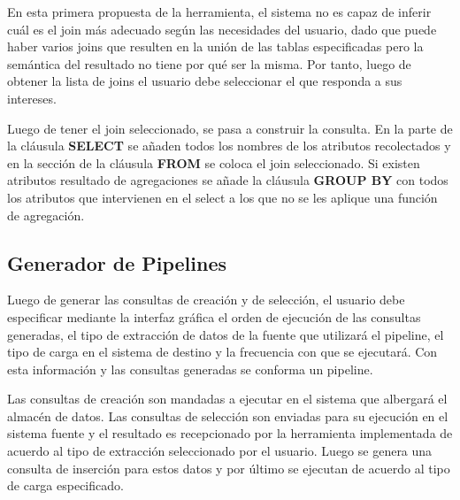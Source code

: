 En esta primera propuesta de la herramienta, el sistema no es capaz de inferir cu\'al es el join 
m\'as adecuado según las necesidades del usuario, dado que puede haber varios joins que resulten 
en la uni\'on de las tablas especificadas pero la semántica del resultado no tiene por qu\'e ser 
la misma. Por tanto, luego de obtener la lista de joins el usuario debe seleccionar el que responda 
a sus intereses.

Luego de tener el join seleccionado, se pasa a construir la consulta. En la parte de la cláusula 
\textbf{SELECT} se añaden todos los nombres de los atributos recolectados y en la sección de la cláusula 
\textbf{FROM} se coloca el join seleccionado. Si existen atributos resultado de agregaciones se añade 
la cláusula \textbf{GROUP BY} con todos los atributos que intervienen en el select a los que no 
se les aplique una función de agregación.


\subsection{Generador de Pipelines}

Luego de generar las consultas de creación y de selección, el usuario debe especificar 
mediante la interfaz gráfica el orden de ejecución de las consultas generadas, 
el tipo de extracción de datos de la fuente que utilizar\'a el pipeline, el tipo de carga 
en el sistema de destino y la frecuencia con que se ejecutar\'a. Con esta información y las 
consultas generadas se conforma un pipeline. 

Las consultas de creación son mandadas a ejecutar en el sistema que albergar\'a el almacén de 
datos. Las consultas de selección son enviadas para su ejecución en el sistema fuente y el resultado 
es recepcionado por la herramienta implementada de acuerdo al tipo de extracción seleccionado por el usuario. 
Luego se genera una consulta de inserción para estos 
datos y por \'ultimo se ejecutan de acuerdo al tipo de carga especificado.
